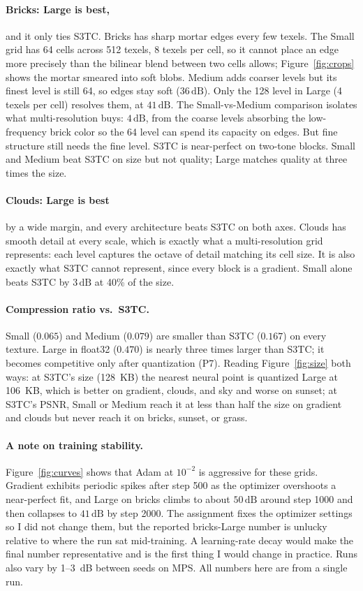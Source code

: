 \documentclass[11pt]{article}
\newcommand{\dB}{\,\mathrm{dB}}
\begin{document}
\paragraph{Bricks: Large is best,} and it only ties S3TC. Bricks has sharp mortar edges every few texels. The Small grid has 64 cells across 512 texels, 8 texels per cell, so it cannot place an edge more precisely than the bilinear blend between two cells allows; Figure~\ref{fig:crops} shows the mortar smeared into soft blobs. Medium adds coarser levels but its finest level is still 64, so edges stay soft ($36\dB$). Only the 128 level in Large (4 texels per cell) resolves them, at $41\dB$. The Small-vs-Medium comparison isolates what multi-resolution buys: $4\dB$, from the coarse levels absorbing the low-frequency brick color so the 64 level can spend its capacity on edges. But fine structure still needs the fine level. S3TC is near-perfect on two-tone blocks. Small and Medium beat S3TC on size but not quality; Large matches quality at three times the size.

\paragraph{Clouds: Large is best} by a wide margin, and every architecture beats S3TC on both axes. Clouds has smooth detail at every scale, which is exactly what a multi-resolution grid represents: each level captures the octave of detail matching its cell size. It is also exactly what S3TC cannot represent, since every block is a gradient. Small alone beats S3TC by $3\dB$ at 40\% of the size.

\paragraph{Compression ratio vs.\ S3TC.} Small ($0.065$) and Medium ($0.079$) are smaller than S3TC ($0.167$) on every texture. Large in float32 ($0.470$) is nearly three times larger than S3TC; it becomes competitive only after quantization (P7). Reading Figure~\ref{fig:size} both ways: at S3TC's size (128~KB) the nearest neural point is quantized Large at 106~KB, which is better on gradient, clouds, and sky and worse on sunset; at S3TC's PSNR, Small or Medium reach it at less than half the size on gradient and clouds but never reach it on bricks, sunset, or grass.

\paragraph{A note on training stability.} Figure~\ref{fig:curves} shows that Adam at $10^{-2}$ is aggressive for these grids. Gradient exhibits periodic spikes after step 500 as the optimizer overshoots a near-perfect fit, and Large on bricks climbs to about $50\dB$ around step 1000 and then collapses to $41\dB$ by step 2000. The assignment fixes the optimizer settings so I did not change them, but the reported bricks-Large number is unlucky relative to where the run sat mid-training. A learning-rate decay would make the final number representative and is the first thing I would change in practice. Runs also vary by 1--3~dB between seeds on MPS. All numbers here are from a single run.
\end{document}
